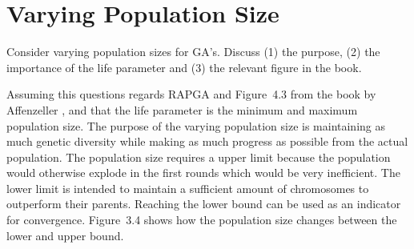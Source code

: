 \documentclass[../main.tex]{subfiles}
\begin{document}
\section{Varying Population Size}
\begin{question}
Consider varying population sizes for GA's. Discuss (1) the purpose, (2) the importance of the life parameter and (3)
the relevant figure in the book.
\end{question}
\begin{solution}
Assuming this questions regards RAPGA and Figure~4.3 from the book by Affenzeller \cite{affenzeller2009genetic}, and
that the life parameter is the minimum and maximum population size. The purpose of the varying population size is
maintaining as much genetic diversity while making as much progress as possible from the actual population. The
population size requires a upper limit because the population would otherwise explode in the first rounds which would
be very inefficient. The lower limit is intended to maintain a sufficient amount of chromosomes to outperform their
parents. Reaching the lower bound can be used as an indicator for convergence. Figure~3.4 shows how the population size
changes between the lower and upper bound.
\end{solution}
\end{document}
